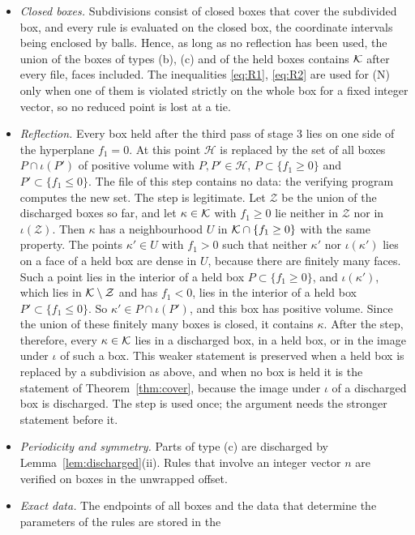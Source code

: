 \begin{itemize}
\item \emph{Closed boxes.} Subdivisions consist of closed boxes that cover the subdivided box, and every rule is evaluated
on the closed box, the coordinate intervals being enclosed by balls. Hence, as long as no reflection has been used, the
union of the boxes of types (b), (c) and of the held boxes contains $\mathcal K$ after every file, faces included. The
inequalities \eqref{eq:R1}, \eqref{eq:R2} are used for (N) only when one of them is violated strictly on the whole box for a
fixed integer vector, so no reduced point is lost at a tie.
\item \emph{Reflection.} Every box held after the third pass of stage 3 lies on one side of the hyperplane $f_1=0$. At
this point $\mathcal H$ is replaced by the set of all boxes $P\cap\iota(P')$ of positive volume with $P,P'\in\mathcal H$,
$P\subset\{f_1\ge0\}$ and $P'\subset\{f_1\le0\}$. The file of this step contains no data: the verifying program computes
the new set. The step is legitimate. Let $\mathcal Z$ be the union of the discharged boxes so far, and let
$\kappa\in\mathcal K$ with $f_1\ge0$ lie neither in $\mathcal Z$ nor in $\iota(\mathcal Z)$. Then $\kappa$ has a neighbourhood
$U$ in $\mathcal K\cap\{f_1\ge0\}$ with the same property. The points $\kappa'\in U$ with $f_1>0$ such that neither $\kappa'$
nor $\iota(\kappa')$ lies on a face of a held box are dense in $U$, because there are finitely many faces. Such a point
lies in the interior of a held box $P\subset\{f_1\ge0\}$, and $\iota(\kappa')$, which lies in $\mathcal K\setminus\mathcal Z$
and has $f_1<0$, lies in the interior of a held box $P'\subset\{f_1\le0\}$. So $\kappa'\in P\cap\iota(P')$, and this box
has positive volume. Since the union of these finitely many boxes is closed, it contains $\kappa$. After the step,
therefore, every $\kappa\in\mathcal K$ lies in a discharged box, in a held box, or in the image under $\iota$ of such a box.
This weaker statement is preserved when a held box is replaced by a subdivision as above, and when no box is held it is
the statement of Theorem~\ref{thm:cover}, because the image under $\iota$ of a discharged box is discharged. The step is
used once; the argument needs the stronger statement before it.
\item \emph{Periodicity and symmetry.} Parts of type (c) are discharged by Lemma~\ref{lem:discharged}(ii). Rules that
involve an integer vector $n$ are verified on boxes in the unwrapped offset.
\item \emph{Exact data.} The endpoints of all boxes and the data that determine the parameters of the rules are stored in the

\end{itemize}
